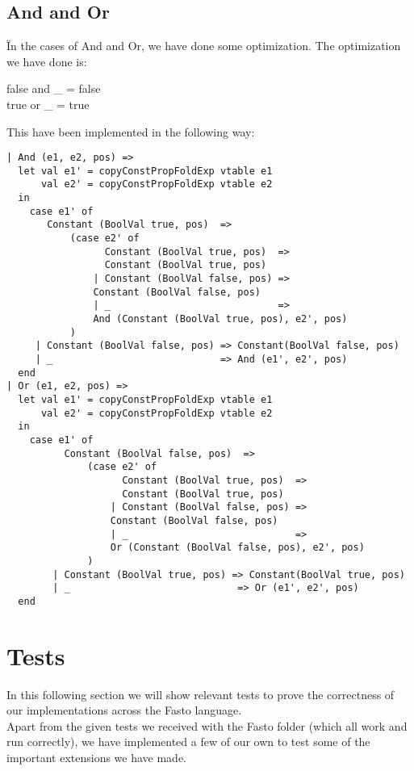 \documentclass[12pt]{article}
\begin{document}
\subsection{And and Or}
Ïn the cases of And and Or, we have done some optimization. The optimization we have done is:
\begin{center}
false and \_ = false\\
true or \_ = true
\end{center}
This have been implemented in the following way:
\begin{verbatim}
| And (e1, e2, pos) =>
  let val e1' = copyConstPropFoldExp vtable e1
      val e2' = copyConstPropFoldExp vtable e2
  in 
    case e1' of
       Constant (BoolVal true, pos)  => 
           (case e2' of
                 Constant (BoolVal true, pos)  => 
                 Constant (BoolVal true, pos)
               | Constant (BoolVal false, pos) => 
               Constant (BoolVal false, pos)
               | _                             => 
               And (Constant (BoolVal true, pos), e2', pos)
           )
     | Constant (BoolVal false, pos) => Constant(BoolVal false, pos)
     | _                             => And (e1', e2', pos)
  end
| Or (e1, e2, pos) =>
  let val e1' = copyConstPropFoldExp vtable e1
      val e2' = copyConstPropFoldExp vtable e2
  in 
    case e1' of
          Constant (BoolVal false, pos)  => 
              (case e2' of
                    Constant (BoolVal true, pos)  => 
                    Constant (BoolVal true, pos)
                  | Constant (BoolVal false, pos) => 
                  Constant (BoolVal false, pos)
                  | _                             => 
                  Or (Constant (BoolVal false, pos), e2', pos)
              )
        | Constant (BoolVal true, pos) => Constant(BoolVal true, pos)
        | _                             => Or (e1', e2', pos)
  end
\end{verbatim}

\section{Tests}
In this following section we will show relevant tests to prove the correctness of our implementations across the Fasto language.\\
Apart from the given tests we received with the Fasto folder (which all work and run correctly), we have implemented a few of our own to test some of the important extensions we have made.
\end{document}
